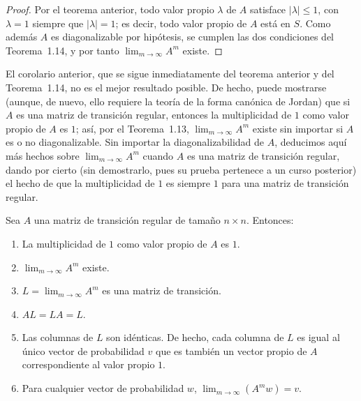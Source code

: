 \documentclass[12pt,a4paper]{book}
\begin{document}
    \begin{proof}
        Por el teorema anterior, todo valor propio $\lambda$ de $A$ satisface $|\lambda|\leq 1$, con $\lambda=1$ siempre que $|\lambda|=1$; es decir, todo valor propio de $A$ está en $S$. Como además $A$ es diagonalizable por hipótesis, se cumplen las dos condiciones del Teorema~1.14, y por tanto $\lim_{m\to\infty}A^m$ existe.
    \end{proof}

    El corolario anterior, que se sigue inmediatamente del teorema anterior y del Teorema~1.14, no es el mejor resultado posible. De hecho, puede mostrarse (aunque, de nuevo, ello requiere la teoría de la forma canónica de Jordan) que si $A$ es una matriz de transición regular, entonces la multiplicidad de $1$ como valor propio de $A$ es $1$; así, por el Teorema~1.13, $\lim_{m\to\infty}A^m$ existe sin importar si $A$ es o no diagonalizable. Sin importar la diagonalizabilidad de $A$, deducimos aquí más hechos sobre $\lim_{m\to\infty}A^m$ cuando $A$ es una matriz de transición regular, dando por cierto (sin demostrarlo, pues su prueba pertenece a un curso posterior) el hecho de que la multiplicidad de $1$ es siempre $1$ para una matriz de transición regular.

    \begin{teorema}
        Sea $A$ una matriz de transición regular de tamaño $n\times n$. Entonces:
        \begin{enumerate}[label=(\alph*)]
            \item La multiplicidad de $1$ como valor propio de $A$ es $1$.
            \item $\lim_{m\to\infty}A^m$ existe.
            \item $L=\lim_{m\to\infty}A^m$ es una matriz de transición.
            \item $AL=LA=L$.
            \item Las columnas de $L$ son idénticas. De hecho, cada columna de $L$ es igual al único vector de probabilidad $v$ que es también un vector propio de $A$ correspondiente al valor propio $1$.
            \item Para cualquier vector de probabilidad $w$, $\lim_{m\to\infty}(A^mw)=v$.
        \end{enumerate}
    \end{teorema}
\end{document}
